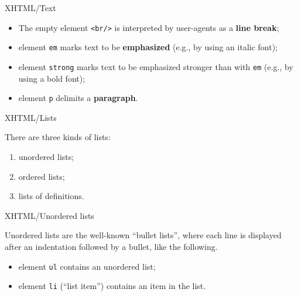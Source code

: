 %
\begin{frame}{XHTML/Text}

\begin{itemize}

  \item The empty element \texttt{<br/>} is interpreted by
    user-agents as a \textbf{line break};

  \item element \texttt{em} marks text to be \textbf{emphasized}
    (e.g., by using an italic font);

  \item element \texttt{strong} marks text to be emphasized stronger
    than with \texttt{em} (e.g., by using a bold font);

  \item element \texttt{p} delimits a \textbf{paragraph}.

\end{itemize}

\end{frame}

%
\begin{frame}{XHTML/Lists}

There are three kinds of lists:
\begin{enumerate}

  \item unordered lists;

  \item ordered lists;

  \item lists of definitions.

\end{enumerate}

\end{frame}

%
\begin{frame}{XHTML/Unordered lists}

Unordered lists are the well-known ``bullet lists'', where each
line is displayed after an indentation followed by a bullet, like the
following.
\begin{itemize}

  \item element \texttt{ul} contains an unordered list;

  \item element \texttt{li} (``list item'') contains an item in the
    list.

\end{itemize}

\end{frame}

